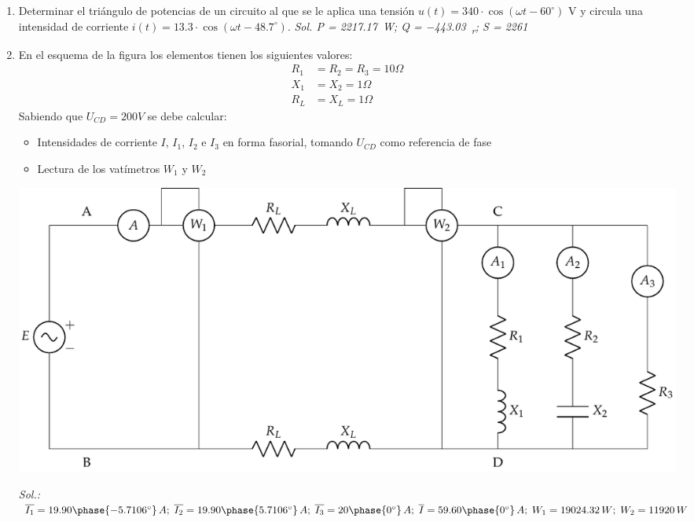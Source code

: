 \begin{enumerate}
\item Determinar el triángulo de potencias de un circuito al que se le
  aplica una tensión $u(t)=340 \cdot \cos(\omega t - 60^\circ)$ V y
  circula una intensidad de corriente
  $i(t)= 13.3 \cdot \cos(\omega t-48.7^\circ)$.  \emph{Sol.  P =
    \qty{2217.17}{\watt}; Q = \qty{-443.03}{\voltampere_r}; S =
    \qty{2261}{\voltampere} }

\item En el esquema de la figura los elementos tienen los siguientes
  valores:
  \begin{align*}
    R_1 &= R_2 = R_3 = {10}{\Omega}\\
    X_1 &= X_2 = {1}{\Omega}\\
    R_L &= X_L = {1}{\Omega}
  \end{align*}
  Sabiendo que $U_{CD} = {200}{V}$ se debe calcular:
  \begin{itemize}
  \item Intensidades de corriente $I$, $I_1$, $I_2$ e $I_3$ {en forma
      fasorial}, tomando $U_{CD}$ como referencia de fase
  \item Lectura de los vatímetros $W_1$ y $W_2$
  \end{itemize}
  \begin{center}
    \includegraphics[width=\linewidth]{../figs/ej8_BT2.pdf}
  \end{center}

  \emph{Sol.:
    $\overline{I_1}=19.90\phase{-5.7106^\circ}\,A;\;
    \overline{I_2}=19.90\phase{5.7106^\circ}\,A;\;
    \overline{I_3}=20\phase{0^\circ}\,A;\;\overline{I}=59.60\phase{0^\circ}\,A;\;W_1=19024.32\,W;\;
    W_2=11920\,W$}


\end{enumerate}
